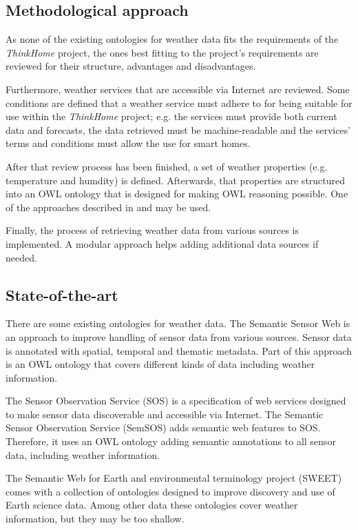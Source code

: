 \documentclass{scrartcl}
\begin{document}
\subsection*{Methodological approach}
As none of the existing ontologies for weather data fits the requirements of the \textit{ThinkHome} project, the ones best fitting to the project's requirements are reviewed for their structure, advantages and disadvantages.

Furthermore, weather services that are accessible via Internet are reviewed. Some conditions are defined that a weather service must adhere to for being suitable for use within the \textit{ThinkHome} project; e.g. the services must provide both current data and forecasts, the data retrieved must be machine-readable and the services' terms and conditions must allow the use for smart homes.

After that review process has been finished, a set of weather properties (e.g. temperature and humdity) is defined. Afterwards, that properties are structured into an OWL ontology that is designed for making OWL reasoning possible. One of the approaches described in \cite{Ontology101} and \cite{SoftwareEngineeringOntology} may be used.

Finally, the process of retrieving weather data from various sources is implemented. A modular approach helps adding additional data sources if needed.

\subsection*{State-of-the-art}

There are some existing ontologies for weather data. The Semantic Sensor Web \cite{SemanticSensorWeb} is an approach to improve handling of sensor data from various sources. Sensor data is annotated with spatial, temporal and thematic metadata. Part of this approach is an OWL ontology that covers different kinds of data including weather information.

The Sensor Observation Service (SOS) \cite{SOS} is a specification of web services designed to make sensor data discoverable and accessible via Internet. The Semantic Sensor Observation Service (SemSOS) \cite{SemSOS} adds semantic web features to SOS. Therefore, it uses an OWL ontology adding semantic annotations to all sensor data, including weather information.

The Semantic Web for Earth and environmental terminology project (SWEET) \cite{SWEET} comes with a collection of ontologies designed to improve discovery and use of Earth science data. Among other data these ontologies cover weather information, but they may be too shallow.



\end{document}
